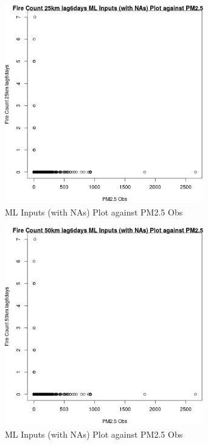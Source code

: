 \begin{figure} 
\centering  
\includegraphics[width=0.77\textwidth]{Code_Outputs/Report_ML_input_PM25_Step4_part_e_de_duplicated_aves_compiled_2019-05-21wNAs_Fire_Count_25km_lag6daysvPM25_Obs.jpg} 
\caption{\label{fig:Report_ML_input_PM25_Step4_part_e_de_duplicated_aves_compiled_2019-05-21wNAsFire_Count_25km_lag6daysvPM25_Obs}ML Inputs (with NAs) Plot against PM2.5 Obs} 
\end{figure} 
 

\begin{figure} 
\centering  
\includegraphics[width=0.77\textwidth]{Code_Outputs/Report_ML_input_PM25_Step4_part_e_de_duplicated_aves_compiled_2019-05-21wNAs_Fire_Count_50km_lag6daysvPM25_Obs.jpg} 
\caption{\label{fig:Report_ML_input_PM25_Step4_part_e_de_duplicated_aves_compiled_2019-05-21wNAsFire_Count_50km_lag6daysvPM25_Obs}ML Inputs (with NAs) Plot against PM2.5 Obs} 
\end{figure} 
 

